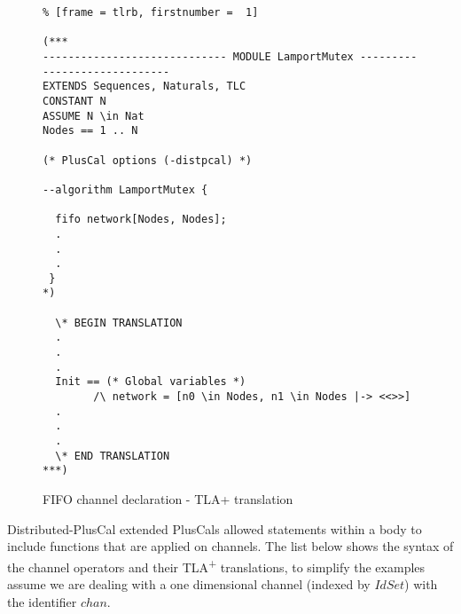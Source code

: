 \documentclass{thesul}
\newcommand{\tlaplus}{TLA\textsuperscript{+}\xspace}
\begin{document}
\FloatBarrier
\begin{figure}[!h]
\begin{lstlisting}% [frame = tlrb, firstnumber =  1]

(***
----------------------------- MODULE LamportMutex -----------------------------
EXTENDS Sequences, Naturals, TLC
CONSTANT N
ASSUME N \in Nat 
Nodes == 1 .. N

(* PlusCal options (-distpcal) *)
  
--algorithm LamportMutex { 

  fifo network[Nodes, Nodes];
  .
  .
  .
 }
*)
  
  \* BEGIN TRANSLATION 
  .
  .
  .
  Init == (* Global variables *)
        /\ network = [n0 \in Nodes, n1 \in Nodes |-> <<>>]
  .
  .
  .      
  \* END TRANSLATION 
***)

\end{lstlisting}
\caption{FIFO channel declaration - TLA+ translation}
\label{fifochannels}
\end{figure}
\FloatBarrier


Distributed-PlusCal extended PlusCals allowed statements within a body to include functions that are applied on channels.
The list below shows the syntax of the channel operators and their \tlaplus translations, to simplify the examples assume we are dealing with a one dimensional channel (indexed by $IdSet$) with the identifier $chan$.
\end{document}
